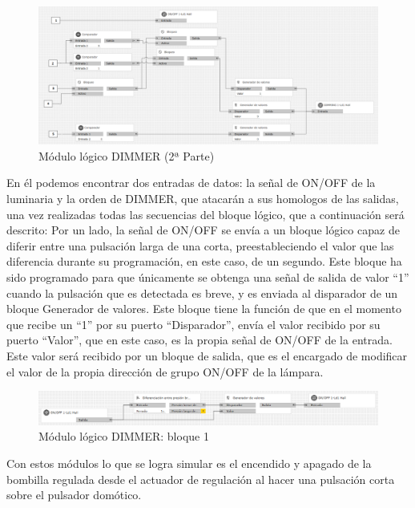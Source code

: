  \begin{center}
\begin{figure}[H]
\includegraphics[width=1.05\textwidth]{figures/log_dimm_der.png}   
\caption{Módulo lógico DIMMER (2ª Parte)}
\label{fig:log_dimm_der}
\end{figure}
\end{center}
En él podemos encontrar dos entradas de datos: la señal de ON/OFF de la luminaria y la orden de DIMMER, que atacarán a sus homologos de las salidas, una vez realizadas todas las secuencias del bloque lógico, que a continuación será descrito: 
\newpage
Por un lado, la señal de ON/OFF se envía a un bloque lógico capaz de diferir entre una pulsación larga de una corta, preestableciendo el valor que las diferencia durante su programación, en este caso, de un segundo. Este bloque ha sido programado para que únicamente se obtenga una señal de salida de valor “1” cuando la pulsación que es detectada es breve, y es enviada al disparador de un bloque Generador de valores. Este bloque tiene la función de que en el momento que recibe un “1” por su puerto “Disparador”, envía el valor recibido por su puerto “Valor”, que en este caso, es la propia señal de ON/OFF de la entrada. Este valor será recibido por un bloque de salida, que es el encargado de modificar el valor de la propia dirección de grupo ON/OFF de la lámpara.
\begin{center}
\begin{figure}[H]
\includegraphics[width=1.15\textwidth]{figures/log_dimm_b1.png}   
\caption{Módulo lógico DIMMER: bloque 1}
\label{fig:log_dimm_b1}
\end{figure}
\end{center}
Con estos módulos lo que se logra simular es el encendido y apagado de la bombilla regulada desde el actuador de regulación al hacer una pulsación corta sobre el pulsador domótico.\\\\
